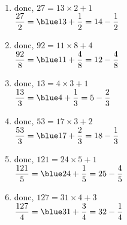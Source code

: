    \ \\ [-5mm]
   \begin{enumerate}
      \item {} donc, $27 =13\times2+1$ \\ [1mm]
         $\dfrac{27}2 =\blue 13+\dfrac12 =14-\dfrac12$ \medskip
      \item {} donc, $92 =11\times8+4$ \\ [1mm]
         $\dfrac{92}8 =\blue 11+\dfrac48 =12-\dfrac48$ \medskip
      \item {} donc, $13 =4\times3+1$ \\ [1mm]
         $\dfrac{13}{3} =\blue 4+\dfrac13 =5-\dfrac23$ \medskip
      \item {} donc, $53 =17\times3+2$ \\ [1mm]
         $\dfrac{53}{3} =\blue 17+\dfrac23 =18-\dfrac13$ \medskip
      \item {} donc, $121 =24\times5+1$ \\ [1mm]
         $\dfrac{121}{5} =\blue 24+\dfrac15 =25-\dfrac45$ \medskip
      \item {} donc, $127 =31\times4+3$ \\ [1mm]
         $\dfrac{127}{4} =\blue 31+\dfrac34 =32-\dfrac14$
   \end{enumerate}
